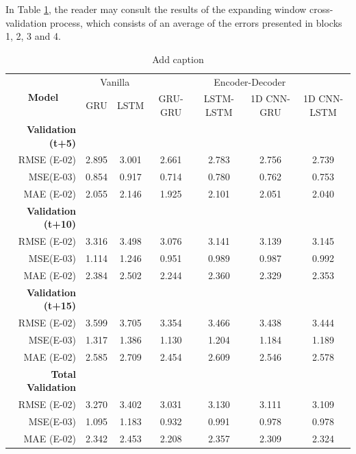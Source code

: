 In Table \ref{valres}, the reader may consult the results of the expanding window cross-validation process, which consists of an average of the errors presented in blocks 1, 2, 3 and 4.

\begin{table}[htbp]
  \centering
  \caption{Add caption}
    \begin{tabular}{r|cc|cccc}
    \multicolumn{1}{c|}{\multirow{2}[1]{*}{\textbf{Model}}} & \multicolumn{2}{c|}{Vanilla} & \multicolumn{4}{c}{Encoder-Decoder} \\
      & GRU & LSTM & GRU-GRU & LSTM-LSTM & 1D CNN-GRU & 1D CNN-LSTM \\
    \midrule
    \textbf{Validation (t+5)} &   &   &   &   &   &  \\
    RMSE (E-02) & 2.895 & 3.001 & 2.661 & 2.783 & 2.756 & 2.739 \\
    MSE(E-03) & 0.854 & 0.917 & 0.714 & 0.780 & 0.762 & 0.753 \\
    MAE (E-02) & 2.055 & 2.146 & 1.925 & 2.101 & 2.051 & 2.040 \\
    \textbf{Validation (t+10)} &   &   &   &   &   &  \\
    RMSE (E-02) & 3.316 & 3.498 & 3.076 & 3.141 & 3.139 & 3.145 \\
    MSE(E-03) & 1.114 & 1.246 & 0.951 & 0.989 & 0.987 & 0.992 \\
    MAE (E-02) & 2.384 & 2.502 & 2.244 & 2.360 & 2.329 & 2.353 \\
    \textbf{Validation (t+15)} &   &   &   &   &   &  \\
    RMSE (E-02) & 3.599 & 3.705 & 3.354 & 3.466 & 3.438 & 3.444 \\
    MSE(E-03) & 1.317 & 1.386 & 1.130 & 1.204 & 1.184 & 1.189 \\
    MAE (E-02) & 2.585 & 2.709 & 2.454 & 2.609 & 2.546 & 2.578 \\
    \midrule
    \textbf{Total Validation} &   &   &   &   &   &  \\
    RMSE (E-02) & 3.270 & 3.402 & 3.031 & 3.130 & 3.111 & 3.109 \\
    MSE(E-03) & 1.095 & 1.183 & 0.932 & 0.991 & 0.978 & 0.978 \\
    MAE (E-02) & 2.342 & 2.453 & 2.208 & 2.357 & 2.309 & 2.324 \\
    \end{tabular}%
  \label{valres}%
\end{table}%





